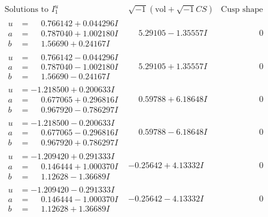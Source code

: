 \documentclass[1p]{elsarticle_modified}
\theoremstyle{definition}
\newcommand{\I}{\sqrt{-1}}
\begin{document}
$$\begin{array}{c|c|c}
\text{Solutions to }I^u_{1}& \I (\text{vol} + \sqrt{-1}CS) & \text{Cusp shape}\\
 \hline 
\begin{aligned}
u &= \phantom{-}0.766142 + 0.044296 I \\
a &= \phantom{-}0.787040 + 1.002180 I \\
b &= \phantom{-}1.56690 + 0.24167 I\end{aligned}
 & \phantom{-}5.29105 - 1.35557 I & \phantom{-0.000000 } 0 \\ \hline\begin{aligned}
u &= \phantom{-}0.766142 - 0.044296 I \\
a &= \phantom{-}0.787040 - 1.002180 I \\
b &= \phantom{-}1.56690 - 0.24167 I\end{aligned}
 & \phantom{-}5.29105 + 1.35557 I & \phantom{-0.000000 } 0 \\ \hline\begin{aligned}
u &= -1.218500 + 0.200633 I \\
a &= \phantom{-}0.677065 + 0.296816 I \\
b &= \phantom{-}0.967920 - 0.786297 I\end{aligned}
 & \phantom{-}0.59788 + 6.18648 I & \phantom{-0.000000 } 0 \\ \hline\begin{aligned}
u &= -1.218500 - 0.200633 I \\
a &= \phantom{-}0.677065 - 0.296816 I \\
b &= \phantom{-}0.967920 + 0.786297 I\end{aligned}
 & \phantom{-}0.59788 - 6.18648 I & \phantom{-0.000000 } 0 \\ \hline\begin{aligned}
u &= -1.209420 + 0.291333 I \\
a &= \phantom{-}0.146444 + 1.000370 I \\
b &= \phantom{-}1.12628 - 1.36689 I\end{aligned}
 & -0.25642 + 4.13332 I & \phantom{-0.000000 } 0 \\ \hline\begin{aligned}
u &= -1.209420 - 0.291333 I \\
a &= \phantom{-}0.146444 - 1.000370 I \\
b &= \phantom{-}1.12628 + 1.36689 I\end{aligned}
 & -0.25642 - 4.13332 I & \phantom{-0.000000 } 0 \\ \hline\begin{aligned}

\end{aligned}
\end{array}$$
\end{document}
